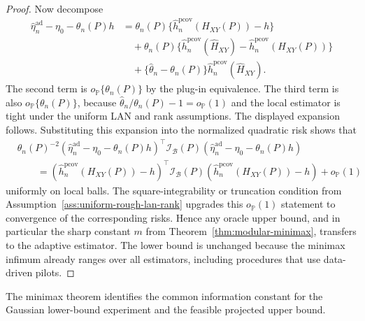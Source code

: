 \documentclass[11pt,a4paper]{amsart}
\theoremstyle{plain}
\theoremstyle{definition}
\theoremstyle{remark}
\newcommand{\PP}{\mathbb{P}}
\newcommand{\scrB}{\mathcal{B}}
\newcommand{\scrI}{\mathcal{I}}
\begin{document}
\begin{proof}
Now decompose
\[
\begin{aligned}
        \widehat\eta_n^{\mathrm{ad}}-\eta_0-\theta_n(P)h
        &=
        \theta_n(P)
        \{\widehat h_n^{\mathrm{pcov}}(H_{XY}(P))-h\}\\
        &\quad+
        \theta_n(P)
        \{\widehat h_n^{\mathrm{pcov}}(\widehat H_{XY})
        -\widehat h_n^{\mathrm{pcov}}(H_{XY}(P))\}\\
        &\quad+
        \{\widehat\theta_n-\theta_n(P)\}
        \widehat h_n^{\mathrm{pcov}}(\widehat H_{XY}) .
\end{aligned}
\]
The second term is \(o_{\PP}\{\theta_n(P)\}\) by the plug-in equivalence.  The third term is also
\(o_{\PP}\{\theta_n(P)\}\), because
\(\widehat\theta_n/\theta_n(P)-1=o_{\PP}(1)\) and the local estimator is tight under the uniform
LAN and rank assumptions.  The displayed expansion follows.  Substituting this expansion
into the normalized quadratic risk shows that
\[
\begin{aligned}
        &\theta_n(P)^{-2}
        (\widehat\eta_n^{\mathrm{ad}}-\eta_0-\theta_n(P)h)^\top
        \scrI_{\scrB}(P)
        (\widehat\eta_n^{\mathrm{ad}}-\eta_0-\theta_n(P)h) \\
        &\qquad=
        (\widehat h_n^{\mathrm{pcov}}(H_{XY}(P))-h)^\top
        \scrI_{\scrB}(P)
        (\widehat h_n^{\mathrm{pcov}}(H_{XY}(P))-h)
        +o_{\PP}(1)
\end{aligned}
\]
uniformly on local balls.  The square-integrability or truncation condition from
Assumption~\ref{ass:uniform-rough-lan-rank} upgrades this \(o_{\PP}(1)\) statement to convergence
of the corresponding risks.  Hence any oracle upper bound, and in particular the sharp constant
\(m\) from Theorem~\ref{thm:modular-minimax}, transfers to the adaptive estimator.  The lower
bound is unchanged because the minimax infimum already ranges over all estimators, including
procedures that use data-driven pilots.
\end{proof}

The minimax theorem identifies the common information constant for the Gaussian lower-bound
experiment and the feasible projected upper bound.
\end{document}
